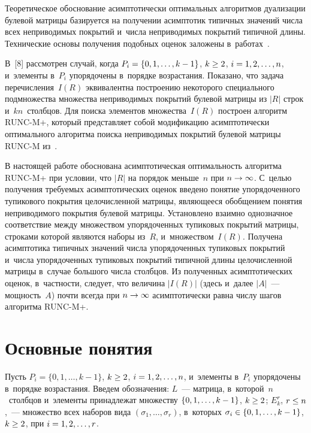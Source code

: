 \begin{multicols}{2}
    Теоретическое обоснование асимптотически оптимальных алгоритмов 
дуализации булевой мат\-ри\-цы базируется на получении асимптотик типичных 
значений числа всех неприводимых покрытий и~числа неприводимых покрытий 
типичной длины. Технические основы получения подобных оценок заложены 
в~работах~\cite{5-duk, 7-duk}.
    
    В~[8] рассмотрен случай, когда $P_i\hm= \{0, 1, \ldots , k\hm-1\}$, 
$k\hm\geq 2$, $i\hm=1,2,\ldots ,n$, и~элементы в~$P_i$ упорядочены в~порядке 
возрастания. Показано, что задача перечисления~$I(R)$ эквивалентна 
построению некоторого специального подмножества множества неприводимых 
покрытий булевой матрицы из $\vert R\vert$ строк и~$kn$~столбцов. Для 
поиска элементов множества~$I(R)$ построен алгоритм RUNC-M+, который 
представляет собой  модификацию асимптотически оптимального алгоритма 
поиска неприводимых покрытий булевой матрицы RUNC-M из~\cite{6-duk}. 
    
    В настоящей работе обоснована асимптотическая оптимальность 
алгоритма RUNC-M+ при условии, что $\vert R\vert$ на порядок меньше~$n$ 
при $n\hm\to \infty$. С~целью получения требуемых асимптотических оценок 
введено понятие упорядоченного тупикового покрытия целочисленной 
матрицы, являющееся обобщением понятия неприводимого покрытия булевой 
матрицы. Установлено взаимно однозначное соответствие между множеством 
упорядоченных тупиковых покрытий матрицы, строками которой являются 
наборы из~$R$, и~множеством~$I(R)$. Получена асимптотика типичных 
значений числа упорядоченных тупиковых покрытий и~числа упорядоченных 
тупиковых покрытий типичной длины целочисленной матрицы в~случае 
большого числа столбцов. Из полученных асимптотических оценок, 
в~частности, следует, что величина $\vert I(R)\vert$ (здесь и~далее $\vert 
A\vert$~--- мощность~$A$) почти всегда при $n\hm\to\infty$ асимптотически 
равна числу шагов алгоритма RUNC-M+. 
    
\section{Основные понятия}

    Пусть $P_i=\{0,1,\ldots, k-1\}$, $k\hm\geq 2$, $i\hm=1,2,\ldots, n$, 
и~элементы в~$P_i$ упорядочены в~порядке воз\-рас\-тания. Введем обозначения: 
$L$~--- матрица, в~которой~$n$~столбцов и~элементы принадлежат мно\-жеству\linebreak 
$\{0,1,\ldots, k\hm-1\}$, $k\hm\geq 2$; $E_k^r$, $r\hm\leq n$,~--- множество всех 
наборов вида $(\sigma_1, \ldots, \sigma_r)$, в~которых $\sigma_i\hm\in \{0,1,\ldots 
,k\hm-1\}$, $k\hm\geq 2$, при $i\hm=1,2,\ldots, r$. 
    

\end{multicols}
